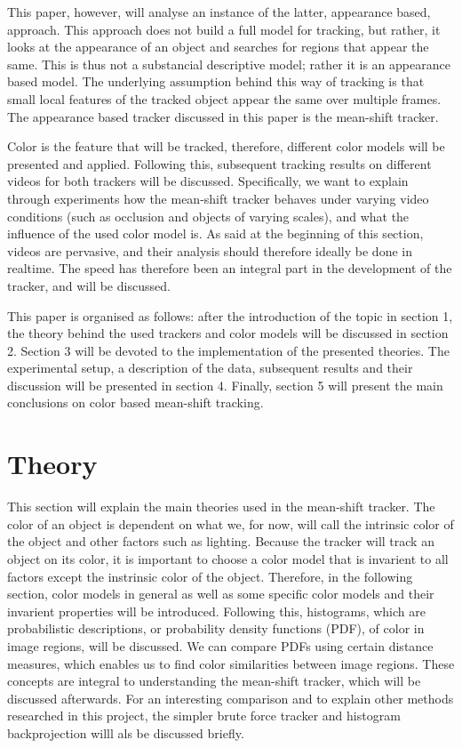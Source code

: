 \documentclass[a4paper,11pt]{article}
\begin{document}
This paper, however, will analyse an instance of the latter, appearance based, approach. This approach does not build a full model for tracking, but rather, it looks at the appearance of an object and searches for regions that appear the same.  This is thus not a substancial descriptive model; rather it is an appearance based model. The underlying assumption behind this way of tracking is that small local features of the tracked object appear the same over multiple frames. The appearance based tracker discussed in this paper is the mean-shift tracker. 

Color is the feature that will be tracked, therefore, different color models will be presented and applied. Following this, subsequent tracking results on different videos for both trackers will be discussed. Specifically, we want to explain through experiments how the mean-shift tracker behaves under varying video conditions (such as occlusion and objects of varying scales), and what the influence of the used color model is. As said at the beginning of this section, videos are pervasive, and their analysis should therefore ideally be done in realtime. The speed has therefore been an integral part in the development of the tracker, and will be discussed. 

This paper is organised as follows:  after the introduction of the topic in section 1, the theory behind the used trackers and color models will be discussed in section 2. Section 3 will be devoted to the implementation of the presented theories. The experimental setup, a description of the data, subsequent results and their discussion will be presented in section 4. Finally, section 5 will present the main conclusions on color based mean-shift tracking.

\section{Theory}	

This section will explain the main theories used in the mean-shift tracker. The color of an object is dependent on what we, for now, will call the intrinsic color of the object and other factors such as lighting. Because the tracker will track an object on its color, it is important to choose a color model that is invarient to all factors except the instrinsic color of the object. Therefore, in the following section, color models in general as well as some specific color models and their invarient properties will be introduced. Following this, histograms, which are probabilistic descriptions, or probability density functions (PDF), of color in image regions, will be discussed. We can compare PDFs using certain distance measures, which enables us to find color similarities between image regions. These concepts are integral to understanding the mean-shift tracker, which will be discussed afterwards. For an interesting comparison and to explain other methods researched in this project, the simpler brute force tracker and histogram backprojection willl als be discussed briefly.  
\end{document}
